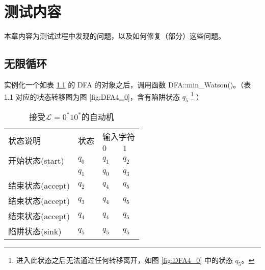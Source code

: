 \chapter{测试内容}

本章内容为测试过程中发现的问题，以及如何修复（部分）这些问题。




\section{无限循环}

实例化一个如表 \ref{tab:DFA4} 的 DFA 的对象之后，调用函数 DFA::min\_Watson()。（表 \ref{tab:DFA4} 对应的状态转移图为图 \ref{fig:DFA4_0}，含有陷阱状态 $q_5$ \footnote{进入此状态之后无法通过任何转移离开，如图 \ref{fig:DFA4_0} 中的状态 {$q_5$}。} ）

\begin{table}[!htbp]
    \caption{接受{$\mathcal{L}=0^*10^*$}的自动机{\cite{book1}}}
    \label{tab:DFA4}
    \centering
    \small%
    \setlength{\tabcolsep}{4pt}%
    \renewcommand{\arraystretch}{1.2}%
        \begin{tabular}{l p{3em}<{\centering} p{3em}<{\centering} p{3em}<{\centering}}
        \toprule %
        \multirow{2}{*}{状态说明} & \multirow{2}{*}{状态} & \multicolumn{2}{c}{输入字符} \\
		\cline{3-4}      &    &$0$ & $1$  \\
        \midrule%
        开始状态(start)  & $q_0$ & $q_1$   & $q_2$   \\
                        & $q_1$ & $q_0$   & $q_3$   \\
        结束状态(accept) & $q_2$ & $q_4$   & $q_5$   \\
        结束状态(accept) & $q_3$ & $q_4$   & $q_5$   \\
        结束状态(accept) & $q_4$ & $q_4$   & $q_5$   \\
        陷阱状态(sink) & $q_5$ & $q_5$   & $q_5$   \\
        \bottomrule%
    \end{tabular}
\end{table}

